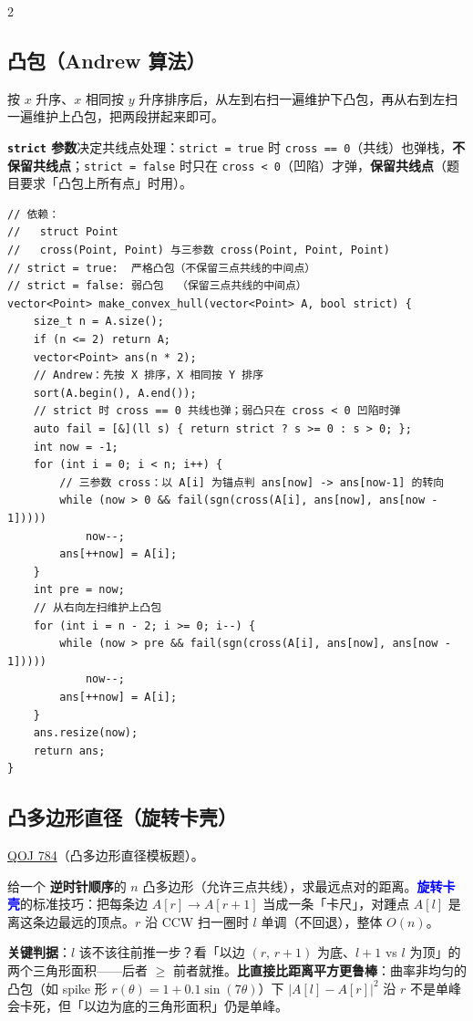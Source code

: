 \begin{multicols*}{2}
		\subsection{凸包（Andrew 算法）}

		按 $x$ 升序、$x$ 相同按 $y$ 升序排序后，从左到右扫一遍维护下凸包，再从右到左扫一遍维护上凸包，把两段拼起来即可。

		\textbf{\texttt{strict} 参数}决定共线点处理：\texttt{strict = true} 时 \texttt{cross == 0}（共线）也弹栈，\textbf{不保留共线点}；\texttt{strict = false} 时只在 \texttt{cross < 0}（凹陷）才弹，\textbf{保留共线点}（题目要求「凸包上所有点」时用）。

		\begin{verbatim}
// 依赖：
//   struct Point
//   cross(Point, Point) 与三参数 cross(Point, Point, Point)
// strict = true:  严格凸包（不保留三点共线的中间点）
// strict = false: 弱凸包  （保留三点共线的中间点）
vector<Point> make_convex_hull(vector<Point> A, bool strict) {
	size_t n = A.size();
	if (n <= 2) return A;
	vector<Point> ans(n * 2);
	// Andrew：先按 X 排序，X 相同按 Y 排序
	sort(A.begin(), A.end());
	// strict 时 cross == 0 共线也弹；弱凸只在 cross < 0 凹陷时弹
	auto fail = [&](ll s) { return strict ? s >= 0 : s > 0; };
	int now = -1;
	for (int i = 0; i < n; i++) {
		// 三参数 cross：以 A[i] 为锚点判 ans[now] -> ans[now-1] 的转向
		while (now > 0 && fail(sgn(cross(A[i], ans[now], ans[now - 1]))))
			now--;
		ans[++now] = A[i];
	}
	int pre = now;
	// 从右向左扫维护上凸包
	for (int i = n - 2; i >= 0; i--) {
		while (now > pre && fail(sgn(cross(A[i], ans[now], ans[now - 1]))))
			now--;
		ans[++now] = A[i];
	}
	ans.resize(now);
	return ans;
}
		\end{verbatim}

		\subsection{凸多边形直径（旋转卡壳）}

		\href{https://vjudge.net/problem/QOJ-784}{QOJ 784}（凸多边形直径模板题）。

		给一个 \textbf{逆时针顺序}的 $n$ 凸多边形（允许三点共线），求最远点对的距离。\textcolor{blue}{\textbf{旋转卡壳}}的标准技巧：把每条边 $A[r] \to A[r{+}1]$ 当成一条「卡尺」，对踵点 $A[l]$ 是离这条边最远的顶点。$r$ 沿 CCW 扫一圈时 $l$ 单调（不回退），整体 $O(n)$。

		\textbf{关键判据}：$l$ 该不该往前推一步？看「以边 $(r,\,r{+}1)$ 为底、$l{+}1$ vs $l$ 为顶」的两个三角形面积——后者 $\ge$ 前者就推。\textbf{比直接比距离平方更鲁棒}：曲率非均匀的凸包（如 spike 形 $r(\theta) = 1 + 0.1\sin(7\theta)$）下 $|A[l] - A[r]|^2$ 沿 $r$ 不是单峰会卡死，但「以边为底的三角形面积」仍是单峰。


\end{multicols*}
